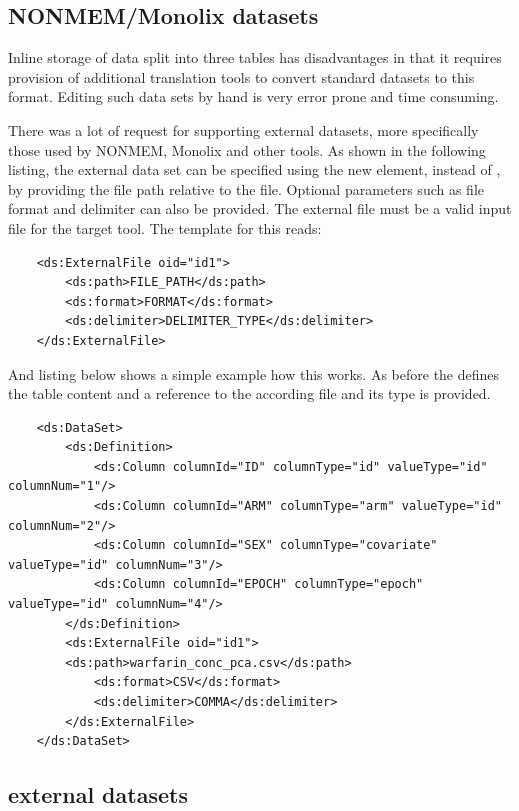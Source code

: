 \subsection{NONMEM/Monolix datasets}
\label{subsec:externalDataset}
Inline storage of data split into three tables has disadvantages in that 
it requires provision of additional translation tools to convert standard 
datasets to this format. Editing such data sets by hand is 
very error prone and time consuming.

There was a lot of request for supporting external datasets, more specifically
those used by NONMEM, Monolix and other tools. 
As shown in the following listing, the external data set can be specified using the 
new  element, instead of , by providing the file 
path relative to the \pml file. Optional parameters such as file format and 
delimiter can also be provided. The external file must be a valid input file for the target tool.
The template for this reads: 
\lstset{language=XML}
\begin{lstlisting}
    <ds:ExternalFile oid="id1">
        <ds:path>FILE_PATH</ds:path>
        <ds:format>FORMAT</ds:format>
        <ds:delimiter>DELIMITER_TYPE</ds:delimiter>
    </ds:ExternalFile>
    \end{lstlisting}
And listing below shows a simple example how this works. As before the 
defines the table content and a reference to the according file and its type is provided.
\lstset{language=XML}
\begin{lstlisting}
    <ds:DataSet>
        <ds:Definition>
            <ds:Column columnId="ID" columnType="id" valueType="id" columnNum="1"/>
            <ds:Column columnId="ARM" columnType="arm" valueType="id" columnNum="2"/>
            <ds:Column columnId="SEX" columnType="covariate" valueType="id" columnNum="3"/>
            <ds:Column columnId="EPOCH" columnType="epoch" valueType="id" columnNum="4"/>
        </ds:Definition>
    	<ds:ExternalFile oid="id1">
	    <ds:path>warfarin_conc_pca.csv</ds:path>
            <ds:format>CSV</ds:format>
            <ds:delimiter>COMMA</ds:delimiter>
        </ds:ExternalFile>
    </ds:DataSet>
\end{lstlisting}

\subsection{ external datasets}
\label{subsec:TrialDesignExternal}

